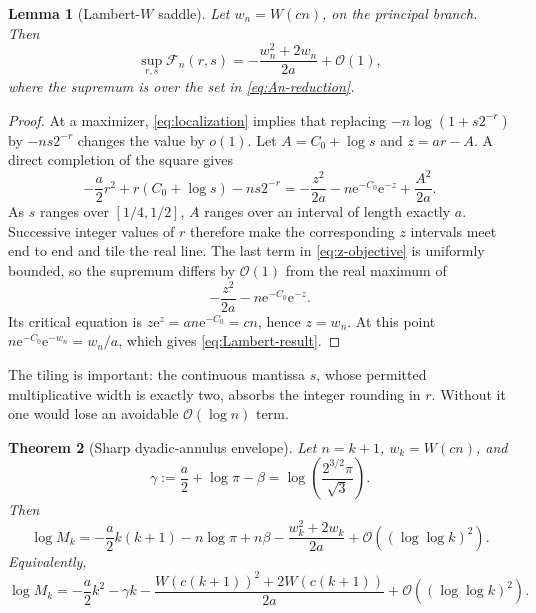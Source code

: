 \documentclass[11pt,oneside]{article}
\newtheorem{theorem}{Theorem}[section]
\newtheorem{lemma}[theorem]{Lemma}
\theoremstyle{definition}
\theoremstyle{remark}
\newcommand{\e}{\mathrm e}
\newcommand{\bigO}{\mathcal O}
\newcommand{\LambertW}{W}
\begin{document}
\begin{lemma}[Lambert-$W$ saddle]
\label{lem:Lambert}
Let $w_n=\LambertW(cn)$, on the principal branch.  Then
\begin{equation}
 \sup_{r,s}\mathcal F_n(r,s)
 =-\frac{w_n^2+2w_n}{2a}+\bigO(1),
 \label{eq:Lambert-result}
\end{equation}
where the supremum is over the set in \eqref{eq:An-reduction}.
\end{lemma}

\begin{proof}
At a maximizer, \eqref{eq:localization} implies that replacing
$-n\log(1+s2^{-r})$ by $-ns2^{-r}$ changes the value by $o(1)$.  Let
$A=C_0+\log s$ and $z=ar-A$.  A direct completion of the square gives
\begin{equation}
 -\frac a2r^2+r(C_0+\log s)-ns2^{-r}
 =-\frac{z^2}{2a}-n\e^{-C_0}\e^{-z}+\frac{A^2}{2a}.
 \label{eq:z-objective}
\end{equation}
As $s$ ranges over $[1/4,1/2]$, $A$ ranges over an interval of length exactly
$a$.  Successive integer values of $r$ therefore make the corresponding
$z$ intervals meet end to end and tile the real line.  The last term in
\eqref{eq:z-objective} is uniformly bounded, so the supremum differs by
$\bigO(1)$ from the real maximum of
\[
 -\frac{z^2}{2a}-n\e^{-C_0}\e^{-z}.
\]
Its critical equation is $z\e^z=an\e^{-C_0}=cn$, hence $z=w_n$.  At this
point $n\e^{-C_0}\e^{-w_n}=w_n/a$, which gives
\eqref{eq:Lambert-result}.
\end{proof}

The tiling is important: the continuous mantissa $s$, whose permitted
multiplicative width is exactly two, absorbs the integer rounding in $r$.
Without it one would lose an avoidable $\bigO(\log n)$ term.

\begin{theorem}[Sharp dyadic-annulus envelope]
\label{thm:annular-main}
Let $n=k+1$, $w_k=\LambertW(cn)$, and
\begin{equation}
 \gamma:=\frac a2+\log\pi-\beta
 =\log\!\left(\frac{2^{3/2}\pi}{\sqrt3}\right).
 \label{eq:gamma}
\end{equation}
Then
\begin{equation}
 \boxed{
 \log M_k=
 -\frac a2k(k+1)-n\log\pi+n\beta
 -\frac{w_k^2+2w_k}{2a}
 +\bigO((\log\log k)^2).}
 \label{eq:annular-centered}
\end{equation}
Equivalently,
\begin{equation}
 \log M_k=
 -\frac a2k^2-\gamma k
 -\frac{\LambertW(c(k+1))^2+2\LambertW(c(k+1))}{2a}
 +\bigO((\log\log k)^2).
 \label{eq:annular-compact}
\end{equation}
\end{theorem}
\end{document}

